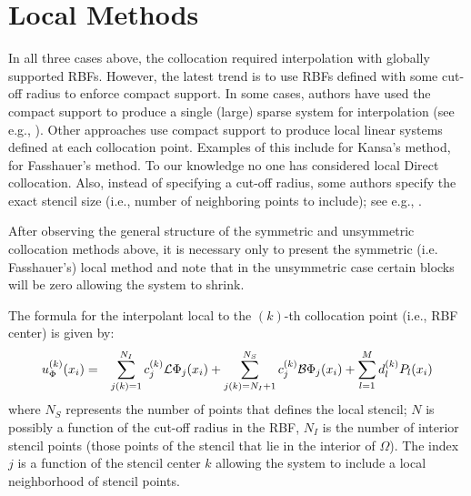 \documentclass{report}
\begin{document}
{\section{Local Methods}
In all three cases above, the collocation required interpolation with globally supported RBFs. However, the latest trend is to use RBFs defined with some cut-off radius to enforce compact support. In some cases, authors have used the compact support to produce a single (large) sparse system for interpolation (see e.g., \cite{Wang2002, Liu2005, Correa2007, Yang2008, Lin2009}). Other approaches use compact support to produce local linear systems defined at each collocation point. Examples of this include \cite{Sarler2006, Vertnik2006} for Kansa's method, \cite{Stevens2008a, Stevens2009a, Stevens2009b} for Fasshauer's method. To our knowledge no one has considered local Direct collocation.  Also, instead of specifying a cut-off radius, some authors specify the exact stencil size (i.e., number of neighboring points to include); see e.g., \cite{Divo2007, Stevens2009b}. 

After observing the general structure of the symmetric and unsymmetric collocation methods above, it is necessary only to present the symmetric (i.e. Fasshauer's) local method and note that in the unsymmetric case certain blocks will be zero allowing the system to shrink. 

The formula for the interpolant local to the $(k)$-th collocation point (i.e., RBF center) is given by: 
\begin{eqnarray}
u^{(k)}_\Phi(x_i) & = & \sum_{j(k)=1}^{N_{I}}  c_j^{(k)} \mathcal{L}\Phi_j(x_i) + \sum_{j(k)=N_{I} + 1}^{N_{S}} c^{(k)}_j\mathcal{B}\Phi_j(x_i) + \sum_{l=1}^{M}d^{(k)}_l P_l(x_i)
\label{eqn:fasshauer_local_approx}
\end{eqnarray}
where $N_{S}$ represents the number of points that defines the local stencil; $N$ is possibly a function of the cut-off radius in the RBF, $N_{I}$ is the number of interior stencil points (those points of the stencil that lie in the interior of $\Omega$). The index $j$ is a function of the stencil center $k$ allowing the system to include a local neighborhood of stencil points.

}
\end{document}
